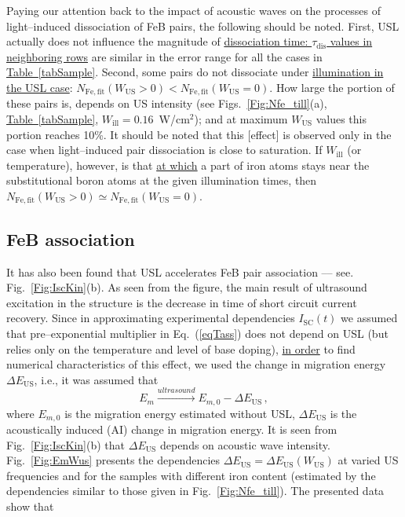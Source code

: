 \documentclass[%
 aip,jap,
 amsmath,amssymb,
 reprint,%
]{revtex4-1}
\begin{document}
Paying our attention back to the impact of acoustic waves on the processes of light--induced dissociation of FeB pairs, the following should be noted.
First,  USL actually does not influence the magnitude of
\textcolor[rgb]{0.00,0.07,1.00}{\uline{
dissociation time:
$\tau_\mathrm{dis}$ values in neighboring rows}}
are similar in the error range for all the cases in
\textcolor[rgb]{0.00,0.07,1.00}{\uline{
Table~\ref{tabSample}}}.
Second, some pairs do not dissociate under \textcolor[rgb]{0.00,0.07,1.00}{\uline{illumination in the USL case}}:
$N_\mathrm{Fe,fit}(W_\mathrm{US}>0)< N_\mathrm{Fe,fit}(W_\mathrm{US}=0)$.
How large the portion of these pairs is, depends on US intensity
(see Figs.~\ref{Fig:Nfe_till}(a),
\textcolor[rgb]{0.00,0.07,1.00}{\uline{
Table~\ref{tabSample}}},
$W_\mathrm{ill}=0.16$~W/cm$^2$);
and at maximum $W_\mathrm{US}$ values this portion reaches 10\%.
It should be noted that this [effect] is observed only in the case when light--induced pair dissociation is close to saturation.
If $W_\mathrm{ill}$ (or temperature), however, is that \textcolor[rgb]{0.00,0.07,1.00}{\uline{at which}}
a part of iron atoms stays near the substitutional boron atoms at the given illumination times,
then $N_\mathrm{Fe,fit}(W_\mathrm{US}>0)\simeq N_\mathrm{Fe,fit}(W_\mathrm{US}=0)$.


\subsection{\label{sec:FeBass}FeB association}

It has also been found that USL accelerates FeB pair association --–
see. Fig.~\ref{Fig:IscKin}(b).
As seen from the figure, the main result of ultrasound excitation in the structure
is the decrease in time of short circuit current recovery.
Since in approximating experimental dependencies $I_\mathrm{SC}(t)$ we assumed that pre--exponential multiplier in Eq.~(\ref{eqTass}) does not depend on USL
(but relies only on the temperature and level of base doping),
\textcolor[rgb]{0.00,0.07,1.00}{\uline{in order}} to find numerical characteristics of this effect,
we used the change in migration energy $\Delta E_\mathrm{US}$, i.e., it was assumed that
\begin{equation}
\label{eqEmUs}
E_m \xrightarrow{ultrasound} E_{m,0}-\Delta E_\mathrm{US}\,,
\end{equation}
where $E_{m,0}$ is the migration energy estimated without USL,
$\Delta E_\mathrm{US}$ is the acoustically induced (AI) change in migration energy.
It is seen from Fig.~\ref{Fig:IscKin}(b)
that $\Delta E_\mathrm{US}$ depends on acoustic wave intensity.
Fig.~\ref{Fig:EmWus} presents the dependencies $\Delta E_\mathrm{US}=\Delta E_\mathrm{US}(W_\mathrm{US})$ at varied US frequencies and for the samples with different iron content
(estimated by the dependencies similar to those given in Fig.~\ref{Fig:Nfe_till}).
The presented data show that
\end{document}
